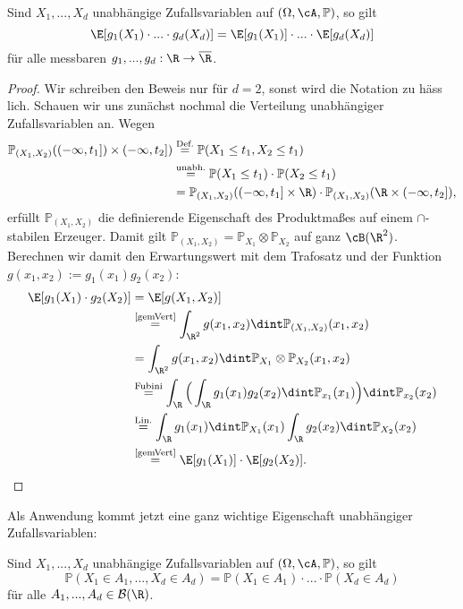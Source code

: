\begin{satz}\label{un}
	Sind $X_1,...,X_d$ unabhängige Zufallsvariablen auf $(\Omega, \cA, \mathbb{P})$, so gilt
	$$ \E[g_1(X_1) \cdot ... \cdot g_d(X_d)] = \E[g_1(X_1)] \cdot ... \cdot \E[g_d(X_d)]$$
	f\"ur alle messbaren $g_1, ..., g_d: \R \to \overline \R$.
\end{satz}

\begin{proof}
	Wir schreiben den Beweis nur f\"ur $d=2$, sonst wird die Notation zu h\"ass lich. Schauen wir uns zun\"achst nochmal die Verteilung unabh\"angiger Zufallsvariablen an. Wegen
	 \begin{align*}
			\mathbb{P}_{(X_1,X_2)}((-\infty,t_1]) \times (-\infty,t_2]) 
			&\overset{\text{Def.}}{=} \mathbb{P}(X_1\leq t_1, X_2 \leq t_1) \\
			&\overset{\text{unabh.}}{=} \mathbb{P}(X_1\leq t_1) \cdot \mathbb{P}(X_2 \leq t_1) \\
			&= \mathbb{P}_{(X_1,X_2)}((-\infty,t_1]\times \R) \cdot \mathbb{P}_{(X_1,X_2)}(\R\times (-\infty,t_2]),
		\end{align*}
		erf\"ullt $\mathbb{P}_{(X_1,X_2)}$ die definierende Eigenschaft des Produktma\ss es auf einem $\cap$-stabilen Erzeuger. Damit gilt $\mathbb{P}_{(X_1,X_2)} = \mathbb{P}_{X_1} \otimes \mathbb{P}_{X_2}$ auf ganz $\cB(\R^2)$. Berechnen wir damit den Erwartungswert mit dem Trafosatz und der Funktion $g(x_1,x_2):=g_1(x_1)g_2(x_2)$:
		 \begin{align*}
			\E[g_1(X_1) \cdot g_2(X_2)] &= \E[g(X_1,X_2)]\\
			&\overset{\text{\ref{gemVert}}}{=} \int_{\R^2} g(x_1,x_2) \dint \mathbb{P}_{(X_1,X_2)}(x_1,x_2)\\
			&= \int_{\R^2} g(x_1,x_2) \dint\mathbb{P}_{X_1} \otimes \mathbb{P}_{X_2}(x_1,x_2)\\
			&\overset{\text{Fubini}}{=} \int_{\R} \Big(\int_{\R} g_1(x_1) g_2(x_2) \dint\mathbb{P}_{x_1}(x_1)\Big) \dint\mathbb{P}_{x_2}(x_2)\\
			& \overset{\text{Lin.}}{=} \int_{\R} g_1(x_1) \dint\mathbb{P}_{X_1}(x_1) \int_{\R} g_2(x_2) \dint\mathbb{P}_{X_2}(x_2)\\
			&\overset{\text{\ref{gemVert}}}{=} \E[g_1(X_1)] \cdot \E[g_2(X_2)].
		\end{align*}
\end{proof}
Als Anwendung kommt jetzt eine ganz wichtige Eigenschaft unabh\"angiger Zufallsvariablen:
\begin{korollar}
	Sind $X_1,...,X_d$ unabhängige Zufallsvariablen auf $(\Omega, \cA, \mathbb{P})$, so gilt $$\mathbb{P}(X_1 \in A_1,...,X_d \in A_d) = \mathbb{P}(X_1 \in A_1) \cdot ... \cdot \mathbb{P}(X_d \in A_d)$$ f\"ur alle $A_1, ..., A_d\in \mathcal B(\R)$.
\end{korollar}

